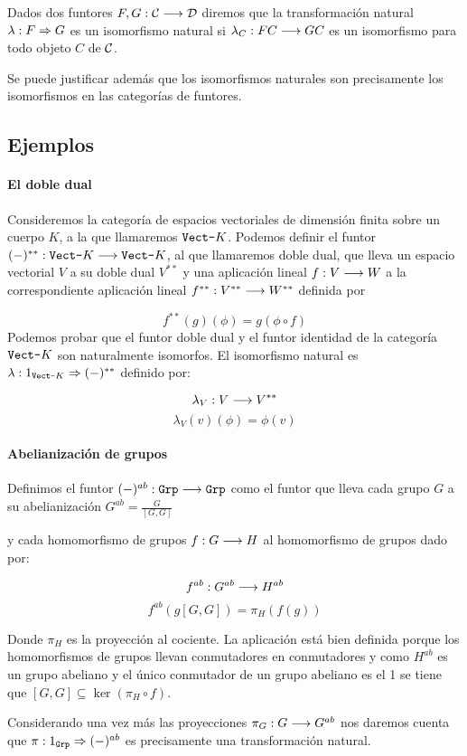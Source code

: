 \begin{definition}
  Dados dos funtores $F, G : \mathcal{C}\longrightarrow \mathcal{D}$ diremos que la transformación
  natural $\lambda : F\Rightarrow G$ es un isomorfismo natural si
  $\lambda_C : FC\longrightarrow GC$ es un isomorfismo para todo objeto $C$
  de $\mathcal{C}$.
\end{definition}

Se puede justificar además que los isomorfismos naturales
son precisamente los isomorfismos en las categorías de funtores.

\subsection{Ejemplos}
\paragraph{El doble dual}
Consideremos la categoría de espacios vectoriales de dimensión
finita sobre un cuerpo $K$, a la que llamaremos $\texttt{Vect-}K$. Podemos
definir el funtor $(-)^{**}: \texttt{Vect-}K\longrightarrow \texttt{Vect-}K$, al que llamaremos
doble dual, que lleva un espacio vectorial $V$ a su doble dual
$V^{**}$ y una aplicación lineal
$f: V\longrightarrow W$ a la correspondiente aplicación
lineal
$f^{**} : V^{**}\longrightarrow W^{**}$ definida por

$$f^{**}(g)(\phi) = g(\phi\circ f)$$
Podemos probar que el funtor doble dual y el funtor identidad
de la categoría $\texttt{Vect-}K$ son naturalmente isomorfos. El isomorfismo
natural es $\lambda : 1_{\texttt{Vect-}K}\Rightarrow (-)^{**}$ definido por:

$$\lambda_V : V\longrightarrow V^{**}$$
$$\lambda_V(v)(\phi) = \phi(v)$$

\paragraph{Abelianización de grupos}
Definimos el funtor $(-)^{ab} : \texttt{Grp}\longrightarrow \texttt{Grp}$
como el funtor que lleva
cada grupo $G$ a su abelianización
$G^{ab} =\frac{G}{[G, G]}$

y cada homomorfismo de grupos $f : G\longrightarrow H$ al homomorfismo
de grupos dado por:

$$f^{ab} : G^{ab}\longrightarrow H^{ab}$$
$$f^{ab}(g[G, G]) = \pi_H (f(g))$$

Donde $\pi_H$ es la proyección al cociente.
La aplicación está bien definida porque los homomorfismos
de grupos llevan conmutadores en conmutadores y como
$H^{ab}$ es un grupo abeliano y el único conmutador de un
grupo abeliano es el 1 se tiene que
$[G, G] \subseteq \ker (\pi_H \circ f)$.

Considerando una vez más las proyecciones
$\pi_G : G\longrightarrow G^{ab}$ nos daremos cuenta
que $\pi : 1_{\texttt{Grp}}\Rightarrow (-)^{ab}$ es precisamente
una transformación natural.
